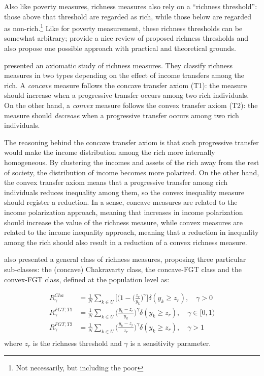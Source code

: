 \documentclass[
]{book}
\begin{document}
Also like poverty measures, richness measures also rely on a ``richness threshold'':
those above that threshold are regarded as rich, while those below are regarded
as non-rich.\footnote{Not necessarily, but including the poor}
Like for poverty measurement, these richness thresholds can be somewhat arbitrary;
\textcite{medeiros2006} provide a nice review of proposed richness thresholds and also propose
one possible approach with practical and theoretical grounds.

\textcite{peichl2010} presented an axiomatic study of richness measures. They classify
richness measures in two types depending on the effect of income transfers among
the rich.
A \emph{concave} measure follows the concave transfer axiom (T1): the measure should
increase when a progressive transfer occurs among two rich individuals.
On the other hand, a \emph{convex} measure follows the convex transfer axiom (T2):
the measure should \emph{decrease} when a progressive transfer occurs among two rich
individuals.

The reasoning behind the concave transfer axiom is that such progressive transfer would make the income distribution among the rich more internally homogeneous. By clustering the incomes and assets of the rich away from the rest of society, the distribution of income becomes more polarized. On the other hand, the convex transfer axiom means that a progressive transfer among rich individuals reduces inequality among them, so the convex inequality measure should register a reduction. In a sense, concave measures are related to the income polarization approach, meaning that increases in income polarization should increase the value of the richness measure, while convex measures are related to the income inequality approach, meaning that a reduction in inequality among the rich should also result in a reduction of a convex richness measure.

\textcite{peichl2010} also presented a general class of richness measures, proposing three
particular sub-classes: the (concave) Chakravarty class, the concave-FGT class and the convex-FGT class, defined at the population level as:

\[
\begin{aligned}
R^{Cha}_\gamma &= \frac{1}{N} \sum_{k \in U} \bigg[( 1 - \bigg( \frac{z_r}{y_k}\bigg)^\gamma \bigg] \delta( y_k \geq z_r ) , \quad \gamma > 0 \\
R^{FGT,T1}_\gamma &= \frac{1}{N} \sum_{k \in U} \bigg( \frac{y_k - z_r}{y_k} \bigg)^\gamma \delta( y_k \geq z_r ) , \quad \gamma \in [0,1) \\
R^{FGT,T2}_\gamma &= \frac{1}{N} \sum_{k \in U} \bigg( \frac{y_k - z_r}{z_r} \bigg)^\gamma \delta( y_k \geq z_r ) , \quad \gamma > 1 \\
\end{aligned}
\]
\noindent where \(z_r\) is the richness threshold and \(\gamma\) is a sensitivity parameter.
\end{document}
